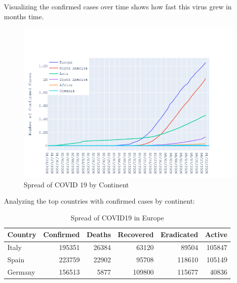 \documentclass{homework}
\begin{document}
Visualizing the confirmed cases over time shows how fast this virus grew in months time.

\begin{figure}[h]
  \centering
  \includegraphics[scale=0.6]{continent}
  \caption{Spread of COVID 19 by Continent}
\end{figure}

\newpage

Analyzing the top countries with confirmed cases by continent:

\begin{table}[H]
  \caption{Spread of COVID19 in Europe}
  \label{Europe Spread}
  \centering
  \begin{tabular}{lrrrrr}
    \toprule
    Country & Confirmed & Deaths & Recovered & Eradicated & Active \\
    \midrule
    Italy   & 195351    & 26384  & 63120     & 89504      & 105847 \\
    Spain   & 223759    & 22902  & 95708     & 118610     & 105149 \\
    Germany & 156513    & 5877   & 109800    & 115677     & 40836  \\
    \bottomrule
  \end{tabular}
\end{table}

\vspace{-1.5em}
\end{document}
